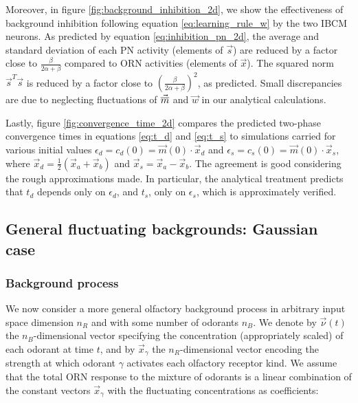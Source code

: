 Moreover, in figure \ref{fig:background_inhibition_2d}, we show the effectiveness of background inhibition following equation \eqref{eq:learning_rule_w} by the two IBCM neurons. As predicted by equation \eqref{eq:inhibition_pn_2d}, the average and standard deviation of each PN activity (elements of $\vec{s}$) are reduced by a factor close to $\frac{\beta}{2\alpha + \beta}$ compared to ORN activities (elements of $\vec{x}$). The squared norm $\vec{s}^T \vec{s}$ is reduced by a factor close to $\left(\frac{\beta}{2\alpha + \beta}\right)^2$, as predicted. Small discrepancies are due to neglecting fluctuations of $\vec{\overline{m}}$ and $\vec{w}$ in our analytical calculations. 

Lastly, figure \ref{fig:convergence_time_2d} compares the predicted two-phase convergence times in equations \eqref{eq:t_d} and \eqref{eq:t_s} to simulations carried for various initial values $\epsilon_d = c_d(0) = \vec{m}(0) \cdot \vec{x}_d$ and $\epsilon_s = c_s(0) = \vec{m}(0) \cdot \vec{x}_s$, where $\vec{x}_d = \frac12 \left(\vec{x}_a + \vec{x}_b\right)$ and $\vec{x}_s = \vec{x}_a - \vec{x}_b$. The agreement is good considering the rough approximations made. In particular, the analytical treatment predicts that $t_d$ depends only on $\epsilon_d$, and $t_s$, only on $\epsilon_s$, which is approximately verified. 



\subsection{General fluctuating backgrounds: Gaussian case}
\label{subsect:gaussian_case}

\subsubsection{Background process}
\label{subsubsect:gaussian_back}

We now consider a more general olfactory background process in arbitrary input space dimension $n_R$ and with some number of odorants $n_B$. We denote by $\vec{\nu}(t)$ the $n_B$-dimensional vector specifying the concentration (appropriately scaled) of each odorant at time $t$, and by $\vec{x}_\gamma$ the $n_R$-dimensional vector encoding the strength at which odorant $\gamma$ activates each olfactory receptor kind. We assume that the total ORN response to the mixture of odorants is a linear combination of  the constant vectors $\vec{x}_\gamma$ with the fluctuating concentrations as coefficients:

